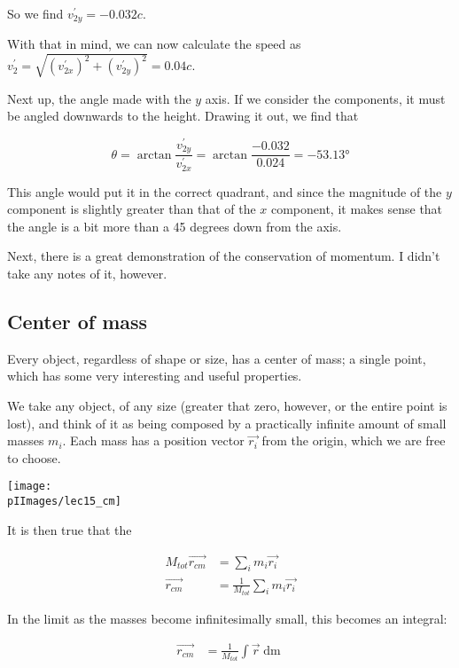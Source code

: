 So we find $v_{2y}^{'} = -0.032c$.

With that in mind, we can now calculate the speed as $v_2^{'} = \sqrt{(v_{2x}^{'})^2 + (v_{2y}^{'})^2} = 0.04c$.

Next up, the angle made with the $y$ axis. If we consider the components, it must be angled downwards to the height. Drawing it out, we find that

\begin{equation}
\theta = \arctan \frac{v_{2y}^{'}}{v_{2x}^{'}} = \arctan \frac{-0.032}{0.024} = \ang{-53.13}
\end{equation}

This angle would put it in the correct quadrant, and since the magnitude of the $y$ component is slightly greater than that of the $x$ component, it makes sense that the angle is a bit more than a 45 degrees down from the axis.

Next, there is a great demonstration of the conservation of momentum. I didn't take any notes of it, however.

\subsection{Center of mass}

Every object, regardless of shape or size, has a center of mass; a single point, which has some very interesting and useful properties.

We take any object, of any size (greater that zero, however, or the entire point is lost), and think of it as being composed by a practically infinite amount of small masses $m_i$. Each mass has a position vector $\vec{r_i}$ from the origin, which we are free to choose.

\begin{center}
\texttt{[image: \\pIImages/lec15\_cm]}
\end{center}

It is then true that the 

\begin{align}
M_{tot} \vec{r_{cm}} &= \sum_i m_i \vec{r_i}\\
\vec{r_{cm}} &= \frac{1}{M_{tot}} \sum_i m_i \vec{r_i}
\end{align}

In the limit as the masses become infinitesimally small, this becomes an integral:

\begin{align}
\vec{r_{cm}} &= \frac{1}{M_{tot}} \int \vec{r} \mathop{dm}
\end{align}

